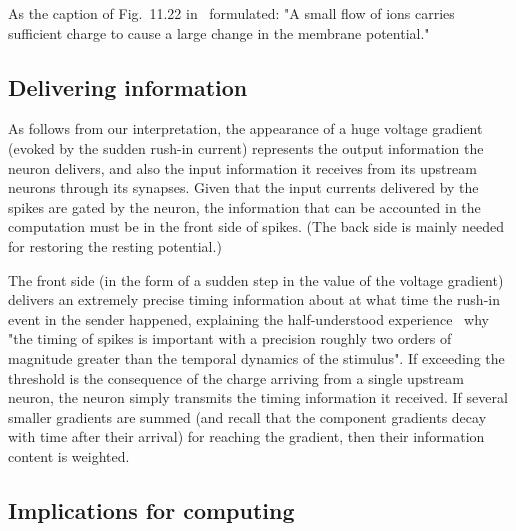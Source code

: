 As the caption of Fig.~11.22 in~\cite{MolecularBiology:2002} formulated:
"A small flow of ions carries sufficient charge
to cause a large change in the membrane potential."



\subsection[Information]{Delivering information\label{sec:Single-OperationInformation}}

As follows from our interpretation, the appearance of a huge voltage gradient
(evoked by the sudden rush-in current) represents the output
information the neuron delivers, and also the input information
it receives from its upstream neurons through its synapses.
Given that the input currents delivered by the spikes
are gated  by the neuron, the information that can be
accounted in the computation must be in the front side of spikes. (The back side is mainly needed for restoring the resting potential.)

The front side (in the form of a sudden step in the value of the voltage gradient) delivers an extremely precise timing information about at what time the rush-in event in the sender happened, explaining the half-understood experience~\cite{SubmillisecondResolution:2008} why
"the timing of spikes is important with a
precision roughly two orders of magnitude greater than the temporal
dynamics of the stimulus". If exceeding the threshold
is the consequence of the charge arriving from a single
upstream neuron, the neuron simply transmits the timing information it received. If several smaller gradients
are summed (and recall that the component gradients decay with
time after their arrival) for reaching the gradient,
then their information content is weighted.


\subsection[Computing]{Implications for computing\label{sec:Single-ImplicationsComputing}}
 
